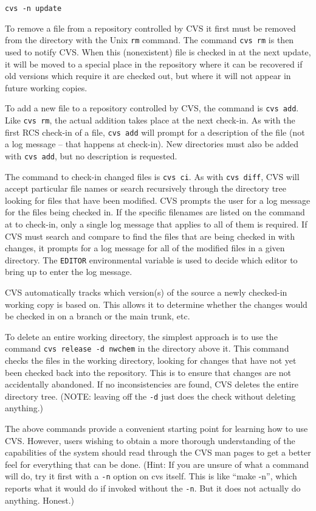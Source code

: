 \begin{verbatim}
cvs -n update
\end{verbatim}

To remove a file from a repository controlled by CVS
it first must be removed from the directory with the Unix {\tt rm} command.  The
command {\tt cvs rm} is then used to notify CVS\@.  When this (nonexistent) file
is checked in at the next update,
it will be moved to a special place in the repository where
it can be recovered if old versions which require it are checked out,
but where it will not appear in future working copies.

To add a new file to a repository controlled by CVS, 
the command is {\tt cvs add}.  Like {\tt cvs
rm}, the actual addition takes place at the next check-in.  As with
the first RCS check-in of a file, {\tt cvs add} will prompt for a
description of the file (not a log message -- that happens at
check-in).  New directories must also be added with {\tt cvs add}, but no
description is requested.

The command to check-in changed files is {\tt cvs ci}.  As with {\tt cvs diff},
CVS will accept particular file names or search recursively through the directory
tree looking for files that have been modified.  CVS prompts the user for a
log message for the files being checked in.  If the specific filenames are listed on
the command at
to check-in, only a single log message that applies to all of them is required.  
If CVS must search and compare to find the files that are being checked in with
changes, it prompts for a log message for
all of the modified files in a given directory.  The {\tt EDITOR}
environmental variable is used to decide which editor to bring up to
enter the log message.

CVS automatically tracks which version(s) of the source a newly checked-in working
copy is based on. This allows it to determine whether the changes would be
checked in on a branch or the main trunk, etc.

To delete an entire working directory, the simplest approach is to use the command
{\tt cvs release -d nwchem} in the directory above it.  This command
checks the files in the working directory, looking for changes that have not
yet been checked back into the repository.  This is to ensure that changes
are not accidentally abandoned.  If no inconsistencies are found, CVS
deletes the entire
directory tree.   (NOTE: leaving off the {\tt -d} just does the check without
deleting anything.)

The above commands provide a convenient starting point for learning how to use CVS.
However, users wishing to obtain a more thorough understanding of the capabilities
of the system should read through the CVS man pages to get a better feel 
for everything that can
be done.  (Hint: If you are unsure of what a command will do, try it first
with a {\tt -n} option on cvs itself.  This is like ``make -n'', which
reports what it would do if invoked without the {\tt -n}.  But it does not actually
do anything.  Honest.)

